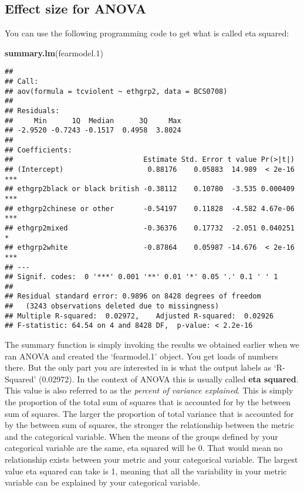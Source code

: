 \documentclass[
]{book}
\newenvironment{Shaded}{\begin{snugshade}}{\end{snugshade}}
\newcommand{\FloatTok}[1]{\textcolor[rgb]{0.00,0.00,0.81}{#1}}
\newcommand{\FunctionTok}[1]{\textcolor[rgb]{0.13,0.29,0.53}{\textbf{#1}}}
\newcommand{\NormalTok}[1]{#1}
\begin{document}
\subsection{Effect size for ANOVA}\label{effect-size-for-anova}

You can use the following programming code to get what is called eta squared:

\begin{Shaded}
\begin{Highlighting}[]
\FunctionTok{summary.lm}\NormalTok{(fearmodel}\FloatTok{.1}\NormalTok{) }
\end{Highlighting}
\end{Shaded}

\begin{verbatim}
## 
## Call:
## aov(formula = tcviolent ~ ethgrp2, data = BCS0708)
## 
## Residuals:
##     Min      1Q  Median      3Q     Max 
## -2.9520 -0.7243 -0.1517  0.4958  3.8024 
## 
## Coefficients:
##                               Estimate Std. Error t value Pr(>|t|)    
## (Intercept)                    0.88176    0.05883  14.989  < 2e-16 ***
## ethgrp2black or black british -0.38112    0.10780  -3.535 0.000409 ***
## ethgrp2chinese or other       -0.54197    0.11828  -4.582 4.67e-06 ***
## ethgrp2mixed                  -0.36376    0.17732  -2.051 0.040251 *  
## ethgrp2white                  -0.87864    0.05987 -14.676  < 2e-16 ***
## ---
## Signif. codes:  0 '***' 0.001 '**' 0.01 '*' 0.05 '.' 0.1 ' ' 1
## 
## Residual standard error: 0.9896 on 8428 degrees of freedom
##   (3243 observations deleted due to missingness)
## Multiple R-squared:  0.02972,    Adjusted R-squared:  0.02926 
## F-statistic: 64.54 on 4 and 8428 DF,  p-value: < 2.2e-16
\end{verbatim}

The summary function is simply invoking the results we obtained earlier when we ran ANOVA and created the `fearmodel.1' object. You get loads of numbers there. But the only part you are interested in is what the output labels as `R-Squared' (0.02972). In the context of ANOVA this is usually called \textbf{eta squared}. This value is also referred to as the \emph{percent of variance explained}. This is simply the proportion of the total sum of squares that is accounted for by the between sum of squares. The larger the proportion of total variance that is accounted for by the between sum of squares, the stronger the relationship between the metric and the categorical variable. When the means of the groups defined by your categorical variable are the same, eta squared will be 0. That would mean no relationship exists between your metric and your categorical variable. The largest value eta squared can take is 1, meaning that all the variability in your metric variable can be explained by your categorical variable.
\end{document}
